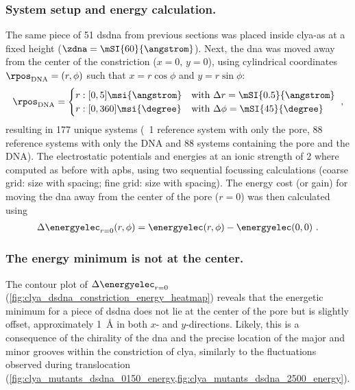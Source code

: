 \subsubsection{System setup and energy calculation.}
%

The same piece of \SI{51}{\bp} \gls{dsdna} from previous sections was placed inside \gls{clya-as} at a fixed
height ($\zdna = \mSI{60}{\angstrom}$). Next, the \gls{dna} was moved away from the center of the
constriction ($x = 0$, $y = 0$), using cylindrical coordinates $\rpos_{\mathrm{DNA}} = (r, \phi)$ such that
$x = r \cos{\phi}$ and $y = r \sin{\phi}$:
%
\begin{equation}
  \rpos_{\mathrm{DNA}} = %
  \begin{cases}
    r: [0,5] \msi{\angstrom} &\mbox{with } \Delta r    = \mSI{0.5}{\angstrom} \\
    r: [0,360] \msi{\degree} &\mbox{with } \Delta \phi = \mSI{45}{\degree} \\
  \end{cases}
  \text{ ,}
\end{equation}
%
resulting in 177 unique systems (\ie~1 reference system with only the pore, 88 reference systems with only the
DNA and 88 systems containing the pore and the DNA). The electrostatic potentials and energies at an ionic
strength of \SI{2}{\Molar} where computed as before with \gls{apbs}, using two sequential focussing
calculations (coarse grid:  size with
 spacing; fine grid:  size with
 spacing). The energy cost (or gain) for moving the \gls{dna} away from
the center of the pore ($r = 0$) was then calculated using
%
\begin{align}
  \Delta \energyelec_{r=0} (r, \phi) = \energyelec (r, \phi) - \energyelec (0,0)
  \text{  .}
\end{align}
%

\subsubsection{The energy minimum is not at the center.}
%


The contour plot of $\Delta \energyelec_{r=0}$ (\cref{fig:clya_dsdna_constriction_energy_heatmap}) reveals
that the energetic minimum for a piece of \gls{dsdna} does not lie at the center of the pore but is slightly
offset, approximately \SI{1}{\angstrom} in both $x$- and $y$-directions. Likely, this is a consequence of the
chirality of the \gls{dna} and the precise location of the major and minor grooves within the constriction of
\gls{clya}, similarly to the fluctuations observed during translocation
(\cref{fig:clya_mutants_dsdna_0150_energy,fig:clya_mutants_dsdna_2500_energy}). 

